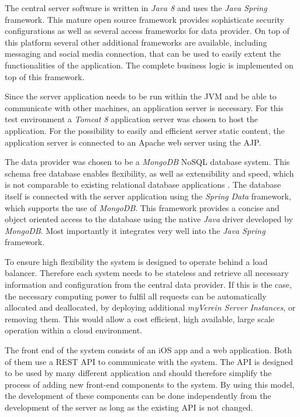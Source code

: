 The central server software is written in \emph{Java 8} and uses the \emph{Java Spring} framework. This mature open source framework provides sophisticate security configurations as well as several access frameworks for data provider. On top of this platform several other additional frameworks are available, including messaging and social media connection, that can be used to easily extent the functionalities of the application. The complete business logic is implemented on top of this framework.

Since the server application needs to be run within the \gls{JVM} and be able to communicate with other machines, an application server is necessary. For this test environment a \emph{Tomcat 8} application server was chosen to host the application. For the possibility to easily and efficient server static content, the application server is connected to an Apache web server using the \gls{AJP}. 

The data provider was chosen to be a \emph{MongoDB} \gls{NoSQL} database system. This schema free database enables flexibility, as well as extensibility and speed, which is not comparable to existing relational database applications \cite{Moschetti:2014aa}. The database itself is connected with the server application using the \emph{Spring Data} framework, which supports the use of \emph{MongoDB}. This framework provides a concise and object oriented access to the database using the native \emph{Java} driver developed by \emph{MongoDB}. Most importantly it integrates very well into the \emph{Java Spring} framework.

To ensure high flexibility the system is designed to operate behind a load balancer. Therefore each system needs to be stateless and retrieve all necessary information and configuration from the central data provider. If this is the case, the necessary computing power to fulfil all requests can be automatically allocated and deallocated, by deploying additional \emph{myVerein Server Instances}, or removing them. This would allow a cost efficient, high available, large scale operation within a cloud environment.  

The front end of the system consists of an iOS app and a web application. Both of them use a \gls{REST} \gls{API} to communicate with the system. The \gls{API} is designed to be used by many different application and should therefore simplify the process of adding new front-end components to the system. By using this model, the development of these components can be done independently from the development of the server as long as the existing \gls{API} is not changed.

